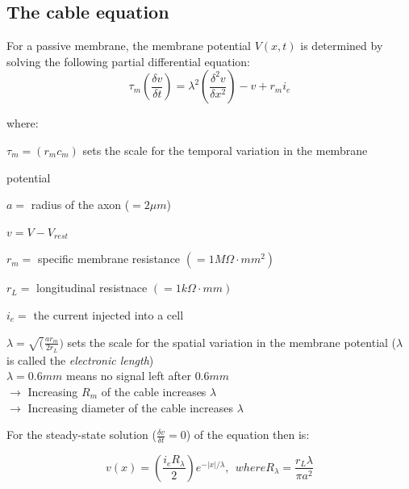 \documentclass[english,11pt]{article}
\begin{document}
\subsection{The cable equation}
For a passive membrane, the membrane potential $V(x, t)$ is determined by solving the following partial differential equation:
\begin{equation}
\tau _m (\frac{\delta v}{\delta t})= \lambda ^2 (\frac{ \delta^2 v}{\delta x^2}) - v + r_m i_e 
\end{equation}

where: 

$\tau_m = (r_m c_m)$ sets the scale for the temporal variation in the membrane 

potential

$a = $ radius of the axon ($= 2 \mu m$)

$v = V - V_{rest}$

$r_m = $ specific membrane resistance $(= 1 M\Omega \cdot mm^2)$

$r_L = $ longitudinal resistnace $(= 1 k\Omega \cdot mm)$

$i_e = $ the current injected into a cell

$\lambda = \sqrt (\frac{a r_m}{2 r_L})$ sets the scale for the spatial variation in the membrane potential ($\lambda$ is called the \textit{electronic length})\\
$\lambda = 0.6mm$ means no signal left after $0.6mm$\\
$\rightarrow$ Increasing $R_m$ of the cable increases $\lambda$\\
$\rightarrow$ Increasing diameter of the cable increases $\lambda$

For the steady-state solution ($\frac{\delta v}{\delta t} = 0$) of the equation then is:

\begin{equation}
v(x) = (\frac{i_e R_\lambda}{2}) e^{-|x|/\lambda},  ~~where R_\lambda = \frac{r_L \lambda}{\pi a^2}
\end{equation}



\end{document}
